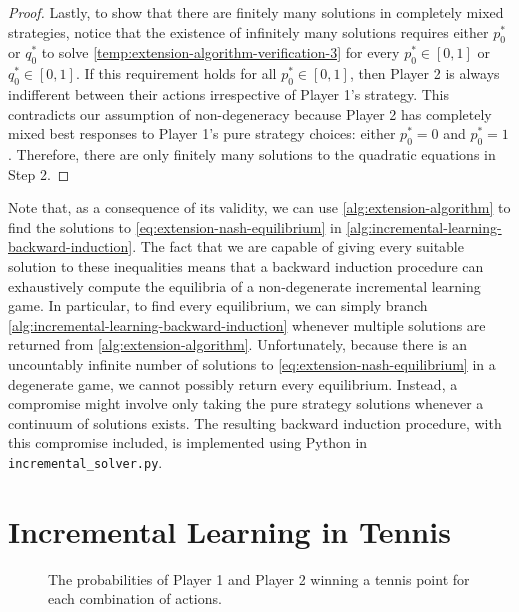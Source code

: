 \begin{proof}
        Lastly, to show that there are finitely many solutions in completely mixed strategies, notice that the existence of infinitely many solutions requires either $p^*_0$ or $q^*_0$ to solve \eqref{temp:extension-algorithm-verification-3} for every $p^*_0 \in [0, 1]$ or $q^*_0 \in [0, 1]$.
        If this requirement holds for all $p^*_0 \in [0, 1]$, then Player 2 is always indifferent between their actions irrespective of Player 1's strategy.
        This contradicts our assumption of non-degeneracy because Player 2 has completely mixed best responses to Player 1's pure strategy choices: either $p^*_0 = 0$ and $p^*_0 = 1$.
        Therefore, there are only finitely many solutions to the quadratic equations in Step 2.
    \end{proof}

    Note that, as a consequence of its validity, we can use \autoref{alg:extension-algorithm} to find the solutions to \eqref{eq:extension-nash-equilibrium} in \autoref{alg:incremental-learning-backward-induction}.
    The fact that we are capable of giving every suitable solution to these inequalities means that a backward induction procedure can exhaustively compute the equilibria of a non-degenerate incremental learning game.
    In particular, to find every equilibrium, we can simply branch \autoref{alg:incremental-learning-backward-induction} whenever multiple solutions are returned from \autoref{alg:extension-algorithm}.
    Unfortunately, because there is an uncountably infinite number of solutions to \eqref{eq:extension-nash-equilibrium} in a degenerate game, we cannot possibly return every equilibrium.
    Instead, a compromise might involve only taking the pure strategy solutions whenever a continuum of solutions exists.
    The resulting backward induction procedure, with this compromise included, is implemented using Python in \texttt{incremental\_solver.py}.



\section{Incremental Learning in Tennis} \label{sec:incremental-learning-in-tennis}
    \begin{figure}[b]
        \centering
        
        \caption[Winning Probabilities in a Simple Tennis Game]{The probabilities of Player 1 and Player 2 winning a tennis point for each combination of actions.}
        \label{fig:tennis-point}
    \end{figure}

